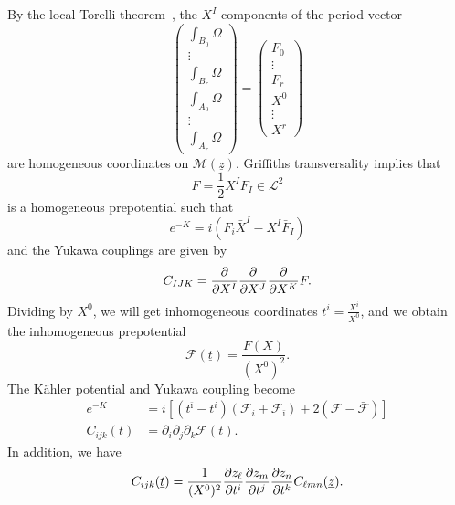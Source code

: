 \documentclass[10pt,oldfontcommands,oneside]{memoir}
\theoremstyle{definition}
\theoremstyle{remark}
\theoremstyle{plain}
\theoremstyle{definition}
\theoremstyle{remark}
\newcommand{\mc}[1]{\mathcal{#1}}
\newcommand{\ut}{\ul{t}}
\newcommand{\uz}{\ul{z}}
\newcommand{\ul}[1]{\underline{#1}}
\newcommand{\1}{\mathbf{1}}
\newcommand{\2}{\mathbf{2}}
\newcommand{\3}{\mathbf{3}}
\begin{document}
By the local Torelli theorem~\cite{periods1,periods2}, the $X^I$ components of the period vector
\[ \begin{pmatrix}
    \int_{B_0} \Omega \\
    \vdots \\
    \int_{B_r} \Omega \\
    \int_{A_0} \Omega \\
    \vdots \\
    \int_{A_r} \Omega
\end{pmatrix} = \begin{pmatrix}
    F_0 \\
    \vdots \\
    F_r \\
    X^0 \\
    \vdots \\
    X^r
\end{pmatrix}
\]
are homogeneous coordinates on $\mc{M}(\uz)$. Griffiths transversality implies that 
\[ F = \frac{1}{2}X^I F_I \in \mc{L}^2 \]
is a homogeneous prepotential such that 
\[ e^{-K} = i (F_i \bar{X}^I - X^I \bar{F}_I) \]
and the Yukawa couplings are given by
\[ C_{IJK} = \pdv{}{X^I}\pdv{}{X^J} \pdv{}{X^K} F. \]
Dividing by $X^0$, we will get inhomogeneous coordinates $t^i = \frac{X^i}{X^0}$, and we obtain the inhomogeneous prepotential
\[ \mc{F}(\ut) = \frac{F(X)}{(X^0)^2}. \]
The K\"ahler potential and Yukawa coupling become
\begin{align*}
    e^{-K} &= i [(t^{\bar{\imath}} - t^i)(\mc{F}_i + \mc{F}_{\bar{\imath}}) + 2 (\mc{F} - \bar{\mc{F}})] \\
    C_{ijk}(\ut) &= \partial_i \partial_j \partial_k \mc{F}(\ut).
\end{align*}
In addition, we have
\[ C_{ijk}(\ut) = \frac{1}{(X^0)^2} \pdv{z_{\ell}}{t^i} \pdv{z_m}{t^j}\pdv{z_n}{t^k} C_{\ell m n} (\uz). \]
\end{document}
